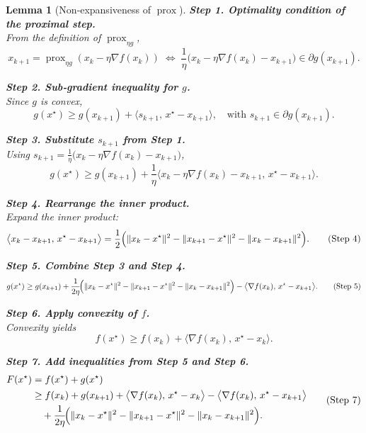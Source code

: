 \documentclass{article}
\newtheorem{lemma}{Lemma}
\newcommand{\prox}{\operatorname{prox}}
\newcommand{\grad}{\nabla}
\begin{document}
\begin{enumerate}[label={\arabic*.},noitemsep]
\begin{lemma}[Non‑expansiveness of $\prox$]
\noindent\textbf{Step 1. Optimality condition of the proximal step.}\\
From the definition of $\prox_{\eta g}$,
\[
x_{k+1}= \prox_{\eta g}(x_{k}-\eta\grad f(x_{k}))
\;\Longleftrightarrow\;
\frac{1}{\eta}\bigl(x_{k}-\eta\grad f(x_{k})-x_{k+1}\bigr)\in\partial g(x_{k+1}).
\tag{Step 1}
\]

\noindent\textbf{Step 2. Sub‑gradient inequality for $g$.}\\
Since $g$ is convex,
\[
g(x^{\star})\ge g(x_{k+1})+\big\langle s_{k+1},\,x^{\star}-x_{k+1}\big\rangle,
\quad\text{with }s_{k+1}\in\partial g(x_{k+1}).
\tag{Step 2}
\]

\noindent\textbf{Step 3. Substitute $s_{k+1}$ from Step 1.}\\
Using $s_{k+1}= \frac{1}{\eta}\bigl(x_{k}-\eta\grad f(x_{k})-x_{k+1}\bigr)$,
\[
g(x^{\star})\ge g(x_{k+1})+\frac{1}{\eta}\big\langle x_{k}-\eta\grad f(x_{k})-x_{k+1},\,x^{\star}-x_{k+1}\big\rangle.
\tag{Step 3}
\]

\noindent\textbf{Step 4. Rearrange the inner product.}\\
Expand the inner product:
\[
\big\langle x_{k}-x_{k+1},\,x^{\star}-x_{k+1}\big\rangle
= \frac{1}{2}\Bigl(\|x_{k}-x^{\star}\|^{2}
-\|x_{k+1}-x^{\star}\|^{2}
-\|x_{k}-x_{k+1}\|^{2}\Bigr).
\tag{Step 4}
\]

\noindent\textbf{Step 5. Combine Step 3 and Step 4.}\\
\[
g(x^{\star})\ge g(x_{k+1})+\frac{1}{2\eta}\!\Bigl(\|x_{k}-x^{\star}\|^{2}
-\|x_{k+1}-x^{\star}\|^{2}
-\|x_{k}-x_{k+1}\|^{2}\Bigr)
-\big\langle\grad f(x_{k}),\,x^{\star}-x_{k+1}\big\rangle.
\tag{Step 5}
\]

\noindent\textbf{Step 6. Apply convexity of $f$.}\\
Convexity yields
\[
f(x^{\star})\ge f(x_{k})+\big\langle\grad f(x_{k}),\,x^{\star}-x_{k}\big\rangle.
\tag{Step 6}
\]

\noindent\textbf{Step 7. Add inequalities from Step 5 and Step 6.}\\
\[
\begin{aligned}
F(x^{\star})&=f(x^{\star})+g(x^{\star})\\
&\ge f(x_{k})+g(x_{k+1})
+\big\langle\grad f(x_{k}),\,x^{\star}-x_{k}\big\rangle
-\big\langle\grad f(x_{k}),\,x^{\star}-x_{k+1}\big\rangle\\
&\quad+\frac{1}{2\eta}\!\Bigl(\|x_{k}-x^{\star}\|^{2}
-\|x_{k+1}-x^{\star}\|^{2}
-\|x_{k}-x_{k+1}\|^{2}\Bigr).
\end{aligned}
\tag{Step 7}
\]


\end{lemma}
\end{enumerate}
\end{document}
